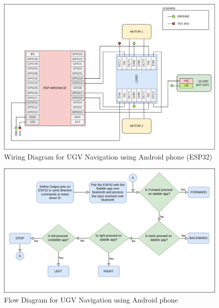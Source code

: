 \begin{figure}[h!]
\centering
\includegraphics[width=\columnwidth]{./Figures/Wiring_UGV_phone.png}
\caption{Wiring Diagram for UGV Navigation using Android phone (ESP32)}
\label{Wiring_UGV_phone}
\end{figure}

\begin{figure}[h!]
\centering
\includegraphics[width=\columnwidth]{./Figures/Flow_UGV_phone.png}
\caption{Flow Diagram for UGV Navigation using Android phone}
\label{Flow_UGV_flysky}
\end{figure}

